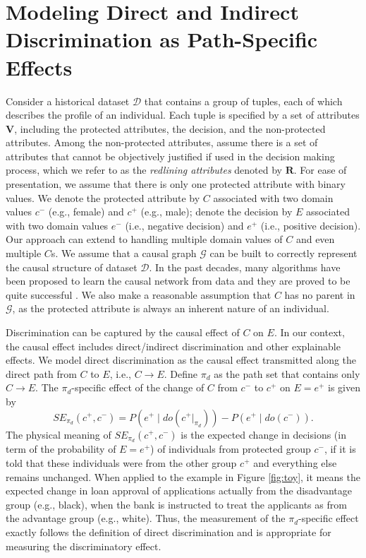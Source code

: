 \documentclass[letterpaper]{article}
\begin{document}
\section{Modeling Direct and Indirect Discrimination as Path-Specific Effects}
Consider a historical dataset $\mathcal{D}$ that contains a group of tuples, each of which describes the profile of an individual. Each tuple is specified by a set of attributes $\mathbf{V}$, including the protected attributes, the decision, and the non-protected attributes. Among the non-protected attributes, assume there is a set of attributes that cannot be objectively justified if used in the decision making process, which we refer to as the \emph{redlining attributes} denoted by $\mathbf{R}$. For ease of presentation, we assume that there is only one protected attribute with binary values. We denote the protected attribute by $C$ associated with two domain values $c^{-}$ (e.g., female) and $c^{+}$ (e.g., male); denote the decision by $E$ associated with two domain values $e^{-}$ (i.e., negative decision) and $e^{+}$ (i.e., positive decision). Our approach can extend to handling multiple domain values of $C$ and even multiple $C$s. We assume that a causal graph $\mathcal{G}$ can be built to correctly represent the causal structure of dataset $\mathcal{D}$. In the past decades, many algorithms have been proposed to learn the causal network from data and they are proved to be quite successful \cite{spirtes2000causation,neapolitan2004learning,colombo2014order,kalisch2007estimating}. We also make a reasonable assumption that $C$ has no parent in $\mathcal{G}$, as the protected attribute is always an inherent nature of an individual. 

Discrimination can be captured by the causal effect of $C$ on $E$. In our context, the causal effect includes direct/indirect discrimination and other explainable effects. We model direct discrimination as the causal effect transmitted along the direct path from $C$ to $E$, i.e., $C\rightarrow E$. Define $\pi_{d}$ as the path set that contains only $C\rightarrow E$. The $\pi_{d}$-specific effect of the change of $C$ from $c^{-}$ to $c^{+}$ on $E=e^{+}$ is given by 
\begin{equation*}
SE_{\pi_{d}}(c^{+},c^{-}) = P(e^{+}\mid do(c^{+}|_{\pi_{d}})) - P(e^{+}\mid do(c^{-})). 
\end{equation*}
The physical meaning of $SE_{\pi_{d}}(c^{+},c^{-})$ is the expected change in decisions (in term of the probability of $E=e^{+}$) of individuals from protected group $c^{-}$, if it is told that these individuals were from the other group $c^{+}$ and everything else remains unchanged. When applied to the example in Figure \ref{fig:toy}, it means the expected change in loan approval of applications actually from the disadvantage group (e.g., black), when the bank is instructed to treat the applicants as from the advantage group (e.g., white). Thus, the measurement of the $\pi_{d}$-specific effect exactly follows the definition of direct discrimination and is appropriate for measuring the discriminatory effect. 
\end{document}
